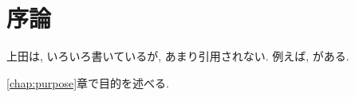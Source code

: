 \chapter{序論}

上田は, いろいろ書いているが, あまり引用されない. 
例えば, \cite{上田2015gihyo,ueda2015,上田2015jsai}
がある. 

\ref{chap:purpose}章で目的を述べる. 

%
